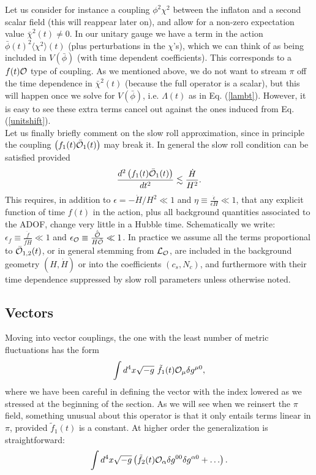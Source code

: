 \documentclass[11pt,amsmath,floats,floatfix,nofootinbib,secnumarabic, superscriptaddress, tightenlines]{revtex4}
\newcommand{\beq}{\begin{equation}}
\newcommand{\eeq}{\end{equation}}
\newcommand{\calo}{{\cal O}}
\newcommand{\calL}{{\cal L}}
\newcommand{\bphi}{{\bar\phi}}
\begin{document}
{Let us consider for instance a coupling $\phi^2\chi^2$ between the inflaton and a second scalar field (this will reappear later on), and allow for a non-zero expectation value $\bar\chi^2(t) \neq 0$. In our unitary gauge we have a term in the action $\bphi(t)^2 \langle\chi^2\rangle (t)$ (plus perturbations in the $\chi$'s), which we can think of as being included in $V(\bphi)$ (with time dependent coefficients). This corresponds to a $f(t)\calo$ type of coupling. As we mentioned above, we do not want to stream $\pi$ off the time dependence in $\bar\chi^2(t)$ (because the full operator is a scalar), but this will happen once we solve for $V(\bphi)$, i.e. $\Lambda(t)$ as in Eq. (\ref{lambt}). However, it is easy to see these extra terms cancel out against the ones induced from Eq. (\ref{unitshift}).\\

Let us finally briefly comment on the slow roll approximation, since in principle the coupling $\left(f_1(t)\bar\calo_1(t)\right)$ may break it. In general the slow roll condition can be satisfied provided
\beq \label{condV} \frac{d^2\left(f_1(t)\bar\calo_1(t)\right)}{dt^2} \lesssim\frac{\dot H}{H^2}.\eeq
This requires, in addition to $\epsilon=-\dot H/H^2\ll 1$ and $\eta \equiv \frac{\dot \epsilon}{\epsilon H}\ll 1$, that any explicit function of time $f(t)$ in the action, plus all background quantities associated to the ADOF, change very little in a Hubble time. Schematically we write:  $\epsilon_f \equiv \frac{\ddot f}{\dot f H}\ll 1$ and $\epsilon_{\calo} \equiv \frac{\dot{\bar\calo}}{H\bar\calo}\ll 1$. In practice we assume all the terms proportional to $\bar\calo_{1,2}(t)$, or in general stemming from $\calL_\calo$, are included in the background geometry $(H,\dot H)$ or into the coefficients $(c_s, N_c)$, and furthermore with their time dependence suppressed by slow roll parameters unless otherwise noted.

\subsection{Vectors}\label{vectors}

Moving into vector couplings, the one with the least number of metric fluctuations has the form
\beq
\label{linpim0}
\int d^4x \sqrt{-g}~\tilde f_1(t)\calo_\mu \delta g^{\mu0},
\eeq
where we have been careful in defining the vector with the index lowered as we stressed at the beginning of the section.
As we will see when we reinsert the $\pi$ field, something unusual about this operator is that it only entails terms linear in $\pi$, provided $\tilde f_1(t)$ is a constant.  At higher order the generalization is straightforward:
\beq
\int d^4x \sqrt{-g} \left(\tilde f_2(t)\calo_\alpha \delta g^{00} \delta g^{\alpha0} +\ldots \right).
\eeq


}
\end{document}
